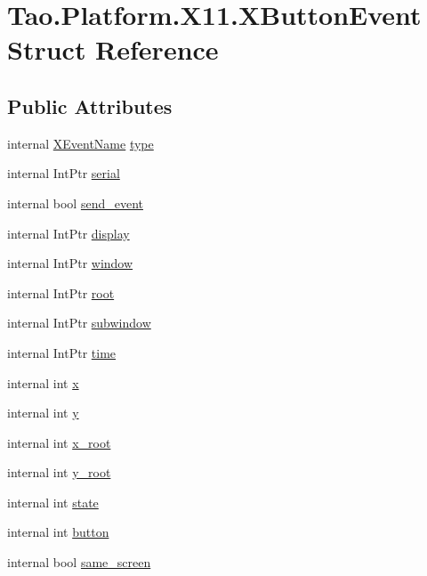 \hypertarget{struct_tao_1_1_platform_1_1_x11_1_1_x_button_event}{
\section{Tao.Platform.X11.XButtonEvent Struct Reference}
\label{struct_tao_1_1_platform_1_1_x11_1_1_x_button_event}
}
\subsection*{Public Attributes}
\begin{DoxyCompactItemize}
\item 
internal \hyperlink{namespace_tao_1_1_platform_1_1_x11_aff81ed5b8778e1ea8e872861dff9f146}{XEventName} \hyperlink{struct_tao_1_1_platform_1_1_x11_1_1_x_button_event_a9f5beb1adb7a5cdf09adf8bfb4296190}{type}
\item 
internal IntPtr \hyperlink{struct_tao_1_1_platform_1_1_x11_1_1_x_button_event_a37e3be1db3d569b45de499061f0c7cc9}{serial}
\item 
internal bool \hyperlink{struct_tao_1_1_platform_1_1_x11_1_1_x_button_event_a3c56065bc25b2c8f3c8d55566c29492d}{send\_\-event}
\item 
internal IntPtr \hyperlink{struct_tao_1_1_platform_1_1_x11_1_1_x_button_event_a035f4ff904fa441b04ccecd4c188964d}{display}
\item 
internal IntPtr \hyperlink{struct_tao_1_1_platform_1_1_x11_1_1_x_button_event_a8564e21bd68f52f498eb8e973377adf4}{window}
\item 
internal IntPtr \hyperlink{struct_tao_1_1_platform_1_1_x11_1_1_x_button_event_a4acb1058d08206d8cb2292032c21a02d}{root}
\item 
internal IntPtr \hyperlink{struct_tao_1_1_platform_1_1_x11_1_1_x_button_event_a2f5d3193f66ff4aa93cc5cfe500856a1}{subwindow}
\item 
internal IntPtr \hyperlink{struct_tao_1_1_platform_1_1_x11_1_1_x_button_event_abc0dbeac9b308a2bc225fa7094600730}{time}
\item 
internal int \hyperlink{struct_tao_1_1_platform_1_1_x11_1_1_x_button_event_a838e77d19a5bc9f7d876c2461e87172d}{x}
\item 
internal int \hyperlink{struct_tao_1_1_platform_1_1_x11_1_1_x_button_event_a64dc4ae7e732db542440c4d4782f0baf}{y}
\item 
internal int \hyperlink{struct_tao_1_1_platform_1_1_x11_1_1_x_button_event_a301e4f77938c9a062ccc3f44969d87d0}{x\_\-root}
\item 
internal int \hyperlink{struct_tao_1_1_platform_1_1_x11_1_1_x_button_event_a1aceecd530143c23dcbb0fffd6f538fe}{y\_\-root}
\item 
internal int \hyperlink{struct_tao_1_1_platform_1_1_x11_1_1_x_button_event_ace85afedb87fb76b4b562e99d4256b57}{state}
\item 
internal int \hyperlink{struct_tao_1_1_platform_1_1_x11_1_1_x_button_event_aa7d9e9ec12a0c79939d54468005c0974}{button}
\item 
internal bool \hyperlink{struct_tao_1_1_platform_1_1_x11_1_1_x_button_event_a958f20c2906955c46178184ea7f34584}{same\_\-screen}
\end{DoxyCompactItemize}


